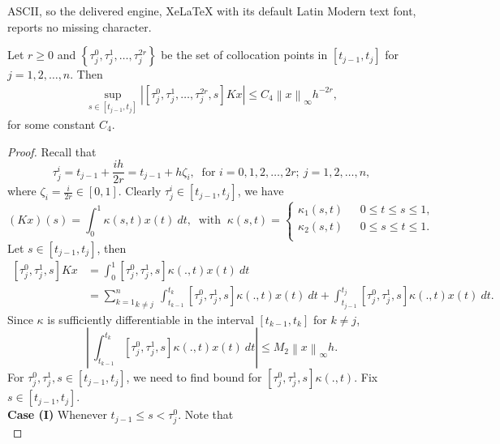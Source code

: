 \documentclass[10pt,a4paper]{amsart}
\newcommand{\norm}[1]{\left\lVert #1\right\rVert}
\begin{document}
ASCII, so the delivered engine, XeLaTeX with its default Latin Modern text font, reports no missing character.
\begin{lemma} \label{le1}
	Let $r \ge 0$ and $\left\{\tau_j^0, \tau_j^1, \ldots, \tau_j^{2r} \right\}$ be the set of collocation points in $[t_{j-1}, t_j]$ for $j = 1, 2, \ldots, n$. Then
	\begin{eqnarray*}
		\sup_{s \in [t_{j-1}, t_j]}	\left|\left[\tau_j^0, \tau_j^1, \ldots, \tau_j^{2r}, s  \right]K x\right| \leq C_4 \norm{x}_\infty h^{-2r},
	\end{eqnarray*}
	for some constant $C_4$.
\end{lemma}

\begin{proof} Recall that
	$$
	\tau_j^i = t_{j-1} + \frac{ih}{2r} = t_{j-1}+h\zeta_i, ~ \text{ for } i = 0, 1, 2, \ldots, 2r; ~ j = 1, 2, \ldots, n,
	$$
	where $\zeta_{i} = \frac{i}{2r} \in [0, 1]$.
	Clearly $\tau_j^i \in [t_{j-1},t_j]$, we have
	\begin{equation*}
		(Kx)(s)=\int_0^1  \kappa(s,t) x(t) ~dt,
		~ \text{ with }~
		\kappa(s,t) = 
		\begin{cases}
			\kappa_1(s,t)    ~~~          & 0\leq t\leq s\leq 1,\\
			\kappa_2(s,t)    ~~~          & 0\leq s\leq t\leq 1.\\
		\end{cases} 
	\end{equation*} 
	Let $s \in [t_{j-1},t_j]$, then
	\begin{align} \label{Eq: 6}
		[\tau_j^0,\tau_j^1,s]Kx&=\int_0^1 [\tau_j^0,\tau_j^1,s] \kappa(.,t) x(t) ~dt \nonumber \\
		&= \underset{k \ne j}{\sum_{k=1}^{n}}~\int_{t_{k-1}}^{t_k} [\tau_j^0,\tau_j^1,s] \kappa(.,t) x(t) ~dt + \int_{t_{j-1}}^{t_j} [\tau_j^0,\tau_j^1,s] \kappa(.,t) x(t) ~dt. 
	\end{align}
	Since $\kappa$ is sufficiently differentiable in the interval $[t_{k-1},t_k]$ for $k \ne j$,
	\begin{equation}\label{Eq: 7}
		\left | ~\int_{t_{k-1}}^{t_k} [\tau_j^0,\tau_j^1,s] \kappa(.,t) x(t) ~dt \right | \le M_2 \norm{x}_\infty h.
	\end{equation}  
	For $\tau_j^0, \tau_j^1, s \in [t_{j-1},t_j]$, we need to find bound for $[\tau_j^0,\tau_j^1,s] \kappa(.,t)$. Fix $s \in [t_{j-1},{t_j}].$ \\
	\noindent
	\textbf{Case (I)}
	Whenever $t_{j-1} \le s < \tau_j^0$. Note that
	\begin{equation*}

\end{equation*}
\end{proof}
\end{document}
